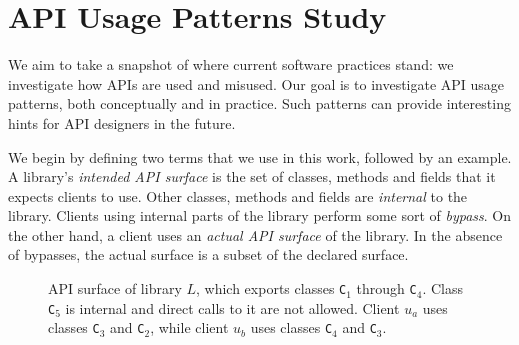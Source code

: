 \chapter{API Usage Patterns Study}
\label{sec:apiusage}
We aim to take a snapshot of where current software practices stand: we investigate how APIs are used and misused. Our goal is to investigate API usage patterns, both conceptually and in practice.
Such patterns can provide interesting hints for API designers in the future.

We begin by defining two terms that we use in this work, followed by an example. 
A library's \emph{intended API surface} is the set of
classes, methods and fields that it expects clients to use. Other
classes, methods and fields are \emph{internal} to the library. Clients using internal parts of the library perform
some sort of \emph{bypass}. On
the other hand, a client uses an \emph{actual API surface} of the
library. In the absence of bypasses, the actual surface is a subset of
the declared surface.


\begin{figure}[h]
 \begin{center}
  \caption{API surface of library $L$, which exports classes \texttt{C}$_1$ through \texttt{C}$_4$. Class \texttt{C}$_5$ is internal and direct calls to it are not allowed. Client $u_a$ uses classes \texttt{C}$_3$ and \texttt{C}$_2$, while client $u_b$ uses classes \texttt{C}$_4$ and \texttt{C}$_3$.}
  \label{fig:api-surface}
 \end{center}
\end{figure}


